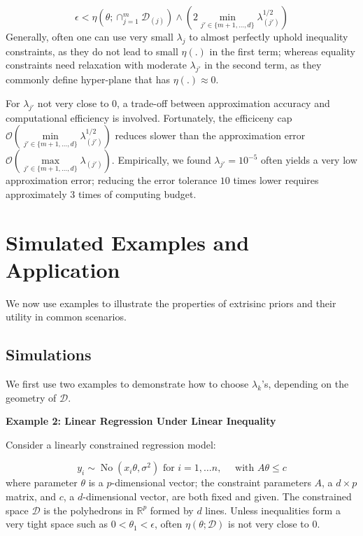 \documentclass[10pt]{article}
\newcommand{\bb}[1]{\mathbb{#1}}
\newcommand{\mc}[1]{\mathcal{#1}}
\DeclareMathOperator{\No}{No}
\DeclareMathOperator{\1}{\mathbbm{1}}
\newcommand{\dt}{\epsilon} %
\begin{document}
\begin{equation}
\label{optimalStabilityCondition}
\dt <  \eta(\theta;{\cap_{j=1}^m \mc D_{(j)}})  \wedge \left(2 \min_{j'\in \{m+1,\ldots,d\}}\lambda_{(j')}^{1/2}\right)
\end{equation}
Generally, often one can use very small $\lambda_j$ to almost perfectly uphold inequality constraints, as they do not lead to small $\eta(.)$ in the first term; whereas equality constraints need relaxation with moderate $\lambda_{j'}$ in the second term, as they commonly define hyper-plane that has $\eta(.)\approx 0$.

For $\lambda_{j'}$ not very close to $0$, a trade-off between approximation accuracy and computational efficiency is involved. Fortunately, the efficiceny cap $\mc O( \underset{j'\in \{m+1,\ldots,d\}} \min\lambda^{1/2}_{(j')})$ reduces slower than the approximation error $\mc O( \underset{j'\in \{m+1,\ldots,d\}} \max\lambda_{(j')})$. Empirically, we found $\lambda_{j'}=10^{-5}$ often yields a very low approximation error; reducing the error tolerance $10$ times 
lower requires approximately $3$ times of computing budget.


\section{Simulated Examples and Application}

We now use examples to illustrate the properties of extrisinc priors and their utility in common scenarios.

\subsection{Simulations}

We first use two examples to demonstrate how to choose $\lambda_{k}$'s, depending on the geometry of $\mc D$.

{\bf Example 2: Linear Regression Under Linear Inequality}

Consider a linearly constrained regression model:

$$y_i \sim \No (x_i \theta, \sigma^2) \text{ for } i=1,\ldots n, \quad\text{ with } A\theta \le c$$
where parameter $\theta$ is a $p$-dimensional vector; the constraint parameters $A$, a $d\times p$ matrix, and $c$, a $d$-dimensional vector, are both fixed and given. The constrained space  $\mc D$ is the polyhedrons in $\bb R^p$ formed by $d$ lines. Unless inequalities form a very tight space such as $0<\theta_1<\epsilon$, often $\eta(\theta;\mc D)$ is not very close to $0$. 
\end{document}
